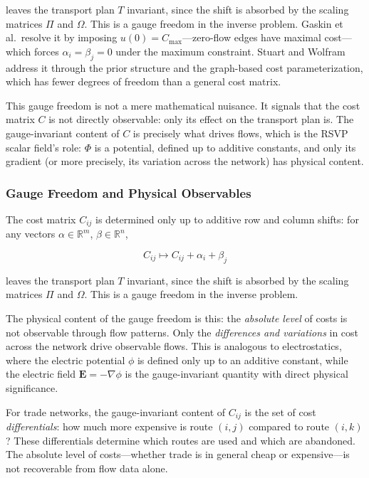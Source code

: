 \documentclass[12pt]{article}
\begin{document}
leaves the transport plan $T$ invariant, since the shift is absorbed by the scaling matrices $\Pi$ and $\Omega$. This is a gauge freedom in the inverse problem. Gaskin et al.\ resolve it by imposing $u(0) = C_{\max}$---zero-flow edges have maximal cost---which forces $\alpha_i = \beta_j = 0$ under the maximum constraint. Stuart and Wolfram address it through the prior structure and the graph-based cost parameterization, which has fewer degrees of freedom than a general cost matrix.

This gauge freedom is not a mere mathematical nuisance. It signals that the cost matrix $C$ is not directly observable: only its effect on the transport plan is. The gauge-invariant content of $C$ is precisely what drives flows, which is the RSVP scalar field's role: $\Phi$ is a potential, defined up to additive constants, and only its gradient (or more precisely, its variation across the network) has physical content.

\subsubsection{Gauge Freedom and Physical Observables}

The cost matrix $C_{ij}$ is determined only up to additive row and column shifts: for any vectors $\alpha \in \mathbb{R}^m$, $\beta \in \mathbb{R}^n$,

\begin{equation}
C_{ij} \mapsto C_{ij} + \alpha_i + \beta_j
\label{eq:gauge_freedom}
\end{equation}

leaves the transport plan $T$ invariant, since the shift is absorbed by the scaling matrices $\Pi$ and $\Omega$. This is a gauge freedom in the inverse problem.

The physical content of the gauge freedom is this: the \emph{absolute level} of costs is not observable through flow patterns. Only the \emph{differences and variations} in cost across the network drive observable flows. This is analogous to electrostatics, where the electric potential $\phi$ is defined only up to an additive constant, while the electric field $\mathbf{E} = -\nabla\phi$ is the gauge-invariant quantity with direct physical significance.

For trade networks, the gauge-invariant content of $C_{ij}$ is the set of cost \emph{differentials}: how much more expensive is route $(i,j)$ compared to route $(i,k)$? These differentials determine which routes are used and which are abandoned. The absolute level of costs---whether trade is in general cheap or expensive---is not recoverable from flow data alone.
\end{document}
